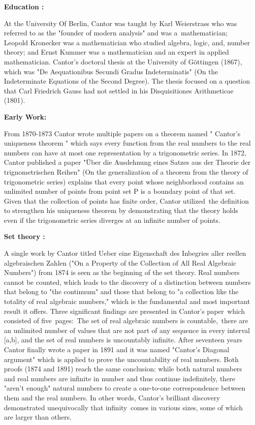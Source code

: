 \documentclass[12pt, a4paper]{article}
\theoremstyle{plain}
\begin{document}
\vspace{0.5cm}

\textbf{Education : } 

At the University Of Berlin, Cantor was taught by Karl Weierstrass who was referred to as the "founder of modern analysis" and was a mathematician; Leopold Kronecker was a mathematician who studied algebra, logic, and, number theory; and Ernst Kummer was a mathematician and an expert in applied mathematician. 
Cantor's doctoral thesis at the University of Göttingen (1867), which was "De Aequationibus Secundi Gradus Indeterminatis" (On the Indeterminate Equations of the Second Degree). The thesis focused on a question that Carl Friedrich Gauss had not settled in his Disquisitiones Arithmeticae (1801).  

\vspace{1cm}
\textbf{Early Work: }

From 1870-1873 Cantor wrote multiple papers on a theorem named " Cantor's uniqueness theorem " which says every function from the real numbers to the real numbers can have at most one representation by a trigonometric series. In 1872, Cantor published a paper "Über die Ausdehnung eines Satzes aus der Theorie der
trignometrischen Reihen" (On the generalization of a theorem from the
theory of trigonometric series) explains that every point whose neighborhood contains an unlimited number of points from point set P is a boundary point of that set. Given that the collection of points has finite order, Cantor utilized the definition to strengthen his uniqueness theorem by demonstrating that the theory holds even if the trigonometric series diverges at an infinite number of points. 

\vspace{0.5cm}
\textbf{Set theory : }

A single work by Cantor titled Ueber eine Eigenschaft des Inbegries aller reellen algebraischen Zahlen ("On a Property of the Collection of All Real Algebraic Numbers") from 1874 is seen as the beginning of the set theory. Real numbers cannot be counted, which leads to the discovery of a distinction between numbers that belong to "the continuum" and those that belong to "a collection like the totality of real algebraic numbers," which is the fundamental and most important result it offers. Three significant findings are presented in Cantor's paper which consisted of five pages: The set of real algebraic numbers is countable, there are an unlimited number of values that are not part of any sequence in every interval [a,b], and the set of real numbers is uncountably infinite. After seventeen years Cantor finally wrote a paper in 1891 and it was named "Cantor’s Diagonal argument" which is applied to prove the uncountability of real numbers. Both proofs (1874 and 1891) reach the same conclusion: while both natural numbers and real numbers are infinite in number and thus continue indefinitely, there "aren't enough" natural numbers to create a one-to-one correspondence between them and the real numbers. In other words, Cantor's brilliant discovery demonstrated unequivocally that infinity comes in various sizes, some of which are larger than others.
\end{document}
